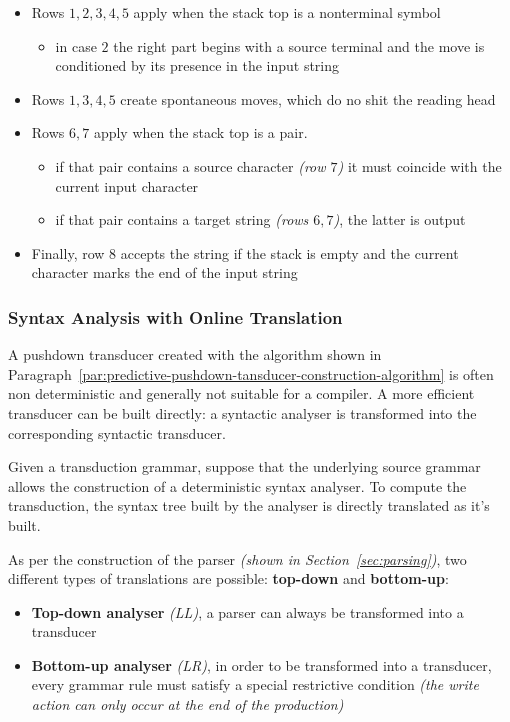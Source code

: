\documentclass[english]{article}
\begin{document}
\begin{itemize}
  \item Rows \(1, 2, 3, 4, 5\) apply when the stack top is a nonterminal symbol
        \begin{itemize}[label=\(\rightarrow\)]
          \item in case \(2\) the right part begins with a source terminal and the move is conditioned by its presence in the input string
        \end{itemize}
  \item Rows \(1, 3, 4, 5\) create spontaneous moves, which do no shit the reading head
  \item Rows \(6, 7\) apply when the stack top is a pair.
        \begin{itemize}[label=\(\rightarrow\)]
          \item if that pair contains a source character \textit{(row \(7\))} it must coincide with the current input character
          \item if that pair contains a target string \textit{(rows \(6, 7\))}, the latter is output
        \end{itemize}
  \item Finally, row \(8\) accepts the string if the stack is empty and the current character marks the end of the input string
\end{itemize}

\subsubsection{Syntax Analysis with Online Translation}

A pushdown transducer created with the algorithm shown in Paragraph~\ref{par:predictive-pushdown-tansducer-construction-algorithm} is often non deterministic and generally not suitable for a compiler.
A more efficient transducer can be built directly:
a syntactic analyser is transformed into the corresponding syntactic transducer.

Given a transduction grammar, suppose that the underlying source grammar allows the construction of a deterministic syntax analyser.
To compute the transduction, the syntax tree built by the analyser is directly translated as it's built.

As per the construction of the parser \textit{(shown in Section~\ref{sec:parsing})}, two different types of translations are possible:
\textbf{top-down} and \textbf{bottom-up}:

\begin{itemize}
  \item \textbf{Top-down analyser} \textit{(LL)}, a parser can always be transformed into a transducer
  \item \textbf{Bottom-up analyser} \textit{(LR)}, in order to be transformed into a transducer, every grammar rule must satisfy a special restrictive condition \textit{(the write action can only occur at the end of the production)}
\end{itemize}
\end{document}
